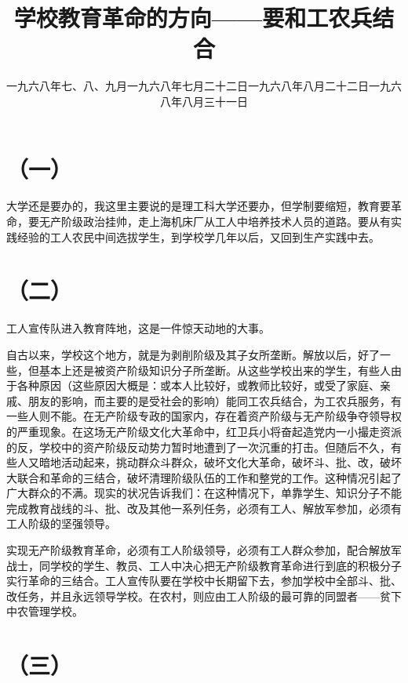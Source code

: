 
\title{学校教育革命的方向——要和工农兵结合}
\date{一九六八年七、八、九月}
\maketitle


\date{一九六八年七月二十二日}
\section*{（一）}

大学还是要办的，我这里主要说的是理工科大学还要办，但学制要缩短，教育要革命，要无产阶级政治挂帅，走上海机床厂从工人中培养技术人员的道路。要从有实践经验的工人农民中间选拔学生，到学校学几年以后，又回到生产实践中去。

\date{一九六八年八月二十二日}
\section*{（二）}

工人宣传队进入教育阵地，这是一件惊天动地的大事。

自古以来，学校这个地方，就是为剥削阶级及其子女所垄断。解放以后，好了一些，但基本上还是被资产阶级知识分子所垄断。从这些学校出来的学生，有些人由于各种原因（这些原因大概是：或本人比较好，或教师比较好，或受了家庭、亲戚、朋友的影响，而主要的是受社会的影响）能同工农兵结合，为工农兵服务，有一些人则不能。在无产阶级专政的国家内，存在着资产阶级与无产阶级争夺领导权的严重现象。在这场无产阶级文化大革命中，红卫兵小将奋起造党内一小撮走资派的反，学校中的资产阶级反动势力暂时地遭到了一次沉重的打击。但随后不久，有些人又暗地活动起来，挑动群众斗群众，破坏文化大革命，破坏斗、批、改，破坏大联合和革命的三结合，破坏清理阶级队伍的工作和整党的工作。这种情况引起了广大群众的不满。现实的状况告诉我们：在这种情况下，单靠学生、知识分子不能完成教育战线的斗、批、改及其他一系列任务，必须有工人、解放军参加，必须有工人阶级的坚强领导。

实现无产阶级教育革命，必须有工人阶级领导，必须有工人群众参加，配合解放军战士，同学校的学生、教员、工人中决心把无产阶级教育革命进行到底的积极分子实行革命的三结合。工人宣传队要在学校中长期留下去，参加学校中全部斗、批、改任务，并且永远领导学校。在农村，则应由工人阶级的最可靠的同盟者——贫下中农管理学校。

\date{一九六八年八月三十一日}
\section*{（三）}

